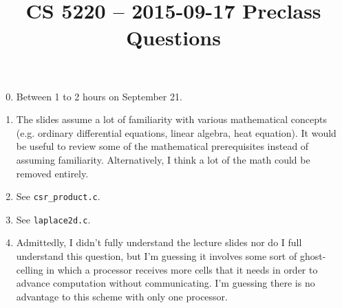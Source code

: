 \documentclass{hw}
\title{CS 5220 -- 2015-09-17 Preclass Questions}
\begin{document}
\maketitle{}

\begin{enumerate}
  \setcounter{enumi}{-1}
  \item Between 1 to 2 hours on September 21.

  \item
    The slides assume a lot of familiarity with various mathematical concepts
    (e.g. ordinary differential equations, linear algebra, heat equation). It
    would be useful to review some of the mathematical prerequisites instead of
    assuming familiarity. Alternatively, I think a lot of the math could be
    removed entirely.

  \item
    See \texttt{csr\_product.c}.

  \item
    See \texttt{laplace2d.c}.

  \item
    Admittedly, I didn't fully understand the lecture slides nor do I full
    understand this question, but I'm guessing it involves some sort of
    ghost-celling in which a processor receives more cells that it needs in
    order to advance computation without communicating. I'm guessing there is
    no advantage to this scheme with only one processor.
\end{enumerate}
\end{document}
